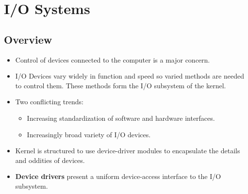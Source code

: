 \documentclass[10pt]{report}
\begin{document}
\chapter{I/O Systems} \label{ch:Chapter13}
	\section{Overview}
		\begin{itemize}
			\item Control of devices connected to the computer is a major concern.
			\item I/O Devices vary widely in function and speed so varied methods are needed to control them. These methods form the I/O subsystem of the kernel.
			\item Two conflicting trends:
			\begin{itemize}
				\item Increasing standardization of software and hardware interfaces.
				\item Increasingly broad variety of I/O devices.
			\end{itemize}
			\item Kernel is structured to use device-driver modules to encapsulate the details and oddities of devices.
			\item \textbf{Device drivers} present a uniform device-access interface to the I/O subsystem.
		\end{itemize}
\end{document}
